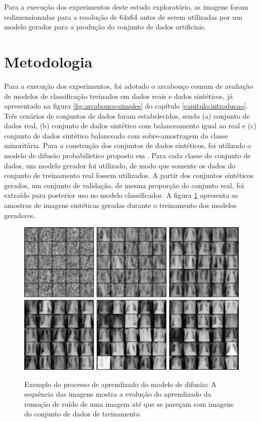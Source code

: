 Para a execução dos experimentos deste estudo exploratório, as imagens foram redimensionadas para a resolução de 64x64 antes de serem utilizadas por um modelo gerador para a produção do conjunto de dados artificiais.

\section{Metodologia}

Para a execução dos experimentos, foi adotado o arcabouço comum de avaliação de modelos de classificação treinados em dados reais e dados sintéticos, já apresentado na figura \ref{fig:arcabouco-simples} do capítulo \ref{capitulo:introducao}. Três cenários de conjuntos de dados foram estabelecidos, sendo (a) conjunto de dados real, (b) conjunto de dados sintético com balanceamento igual ao real e (c) conjunto de dados sintético balanceado com sobre-amostragem da classe minoritária. Para a construção dos conjuntos de dados sintéticos, foi utilizado o modelo de difusão probabilístico proposto em . Para cada classe do conjunto de dados, um modelo gerador foi utilizado, de modo que somente os dados do conjunto de treinamento real fossem utilizados. A partir dos conjuntos sintéticos gerados, um conjunto de validação, de mesma proporção do conjunto real, foi extraído para posterior uso no modelo classificador. A figura \ref{fig:imagens-geradas} apresenta as amostras de imagens sintéticas geradas durante o treinamento dos modelos geradores.

\begin{figure}[htbp]
	\centering
	\caption[Exemplo do processo de aprendizado do modelo de difusão]{Exemplo do processo de aprendizado do modelo de difusão: A sequência das imagens mostra a evolução do aprendizado da remoção de ruído de uma imagem até que se pareçam com imagens do conjunto de dados de treinamento.}
		\includegraphics[scale=.25]{imagens/difussion-generated.jpg}
	\label{fig:imagens-geradas}
\end{figure}

